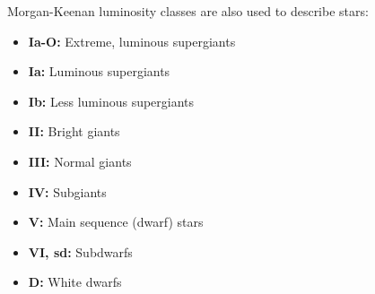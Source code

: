 \documentclass[12pt]{article}
\begin{document}
Morgan-Keenan luminosity classes are also used to describe stars:
\begin{itemize}
    \item \textbf{Ia-O:} Extreme, luminous supergiants
    \item \textbf{Ia:} Luminous supergiants
    \item \textbf{Ib:} Less luminous supergiants
    \item \textbf{II:} Bright giants
    \item \textbf{III:} Normal giants
    \item \textbf{IV:} Subgiants
    \item \textbf{V:} Main sequence (dwarf) stars
    \item \textbf{VI, sd:} Subdwarfs
    \item \textbf{D:} White dwarfs
\end{itemize}
\end{document}
